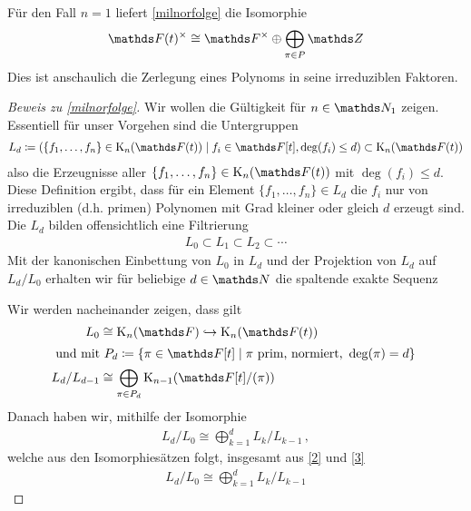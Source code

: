 \documentclass[ngerman,fontsize=11pt, paper=a4, parskip=half, titlepage=true, toc=bib]{scrartcl}
\begin{document}
\begin{Bem}
  Für den Fall $n=1$ liefert \ref{milnorfolge} die Isomorphie
  \begin{gather*}
    \Ft^\times
    \cong \Fx
    \oplus\bigoplus_{\pi\in P}\Z
  \end{gather*}
  Dies ist anschaulich die Zerlegung eines
  Polynoms in seine irreduziblen Faktoren.
\end{Bem}
\begin{proof}[Beweis zu \ref{milnorfolge}]
  Wir wollen die Gültigkeit für $n\in\N_1$ zeigen.
  Essentiell für unser Vorgehen sind die Untergruppen
  \begin{gather*}
    L_d\coloneqq \left(
      \{f_1,\dotsc,f_n\}\in\KnFt 
      \mid f_i\in\F[t],\deg(f_i)\leq d
    \right)
    \subset\KnFt
  \end{gather*}
  also die Erzeugnisse aller $\{f_1,\dotsc,f_n\}\in\KnFt$ mit
  $\deg(f_i)\leq d$. 
  Diese Definition ergibt, dass für ein 
  Element $\{f_1,\dotsc,f_n\}\in L_d$ die $f_i$ nur von 
  irreduziblen (d.h. primen) Polynomen mit
  Grad kleiner oder gleich $d$ erzeugt sind.
  Die $L_d$ bilden offensichtlich eine Filtrierung
  \begin{gather*}
    L_0\subset L_1\subset L_2\subset \dotsb
  \end{gather*}
  Mit der kanonischen Einbettung von $L_0$ in $L_d$ und der Projektion
  von $L_d$ auf $L_d/L_0$ erhalten wir für
  beliebige $d\in\N$ die spaltende exakte Sequenz
  \begin{center}
  \end{center}
  Wir werden nacheinander zeigen, dass gilt
  \begin{align}
    L_0&\cong \KnF\hookrightarrow \KnFt  \label{1}\\
    \intertext{
    und mit $P_d\coloneqq \left\{
    \pi\in \F[t]\mid \pi\text{ prim, normiert, }\deg(\pi)=d
    \right\}$
    }
    L_d/L_{d-1}&\cong \bigoplus_{\pi\in P_d} \K_{n-1}(\Ftpi)\label{2}
  \end{align}
  Danach haben wir, mithilfe der Isomorphie
  \begin{gather} \label{3}
    L_d/L_0\cong \bigoplus_{k=1}^d L_k/L_{k-1} \,,
  \end{gather}
  welche aus den Isomorphiesätzen folgt, insgesamt
  aus \ref{2} und \ref{3}
  \begin{align}\label{4}
    L_d/L_0
    \cong \bigoplus_{k=1}^d L_k/L_{k-1}

\end{align}
\end{proof}
\end{document}
